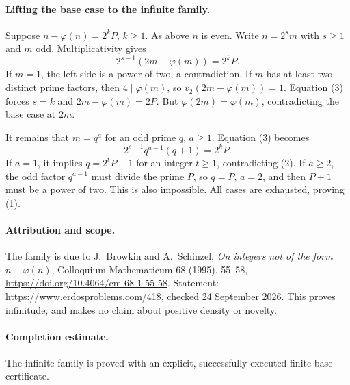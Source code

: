 \paragraph{Lifting the base case to the infinite family.}
Suppose \(n-\varphi(n)=2^kP\), \(k\geq1\). As above \(n\) is even.
Write \(n=2^s m\) with \(s\geq1\) and \(m\) odd. Multiplicativity gives
\[
 2^{s-1}(2m-\varphi(m))=2^kP.
 \tag{3}
\]
If \(m=1\), the left side is a power of two, a contradiction.
If \(m\) has at least two distinct prime factors, then
\(4\mid\varphi(m)\), so \(v_2(2m-\varphi(m))=1\).
Equation (3) forces \(s=k\) and \(2m-\varphi(m)=2P\).
But \(\varphi(2m)=\varphi(m)\), contradicting the base case at \(2m\).

It remains that \(m=q^a\) for an odd prime \(q\), \(a\geq1\).
Equation (3) becomes
\[
 2^{s-1}q^{a-1}(q+1)=2^kP.
\]
If \(a=1\), it implies \(q=2^tP-1\) for an integer \(t\geq1\),
contradicting (2). If \(a\geq2\), the odd factor \(q^{a-1}\)
must divide the prime \(P\), so \(q=P\), \(a=2\), and then \(P+1\)
must be a power of two. This is also impossible. All cases are exhausted,
proving (1).

\paragraph{Attribution and scope.}
The family is due to J.~Browkin and A.~Schinzel,
\emph{On integers not of the form \(n-\varphi(n)\)},
Colloquium Mathematicum 68 (1995), 55--58,
\url{https://doi.org/10.4064/cm-68-1-55-58}.
Statement: \url{https://www.erdosproblems.com/418},
checked 24 September 2026. This proves infinitude, and makes no claim
about positive density or novelty.

\paragraph{Completion estimate.}
The infinite family is proved with an explicit, successfully executed finite base certificate.
